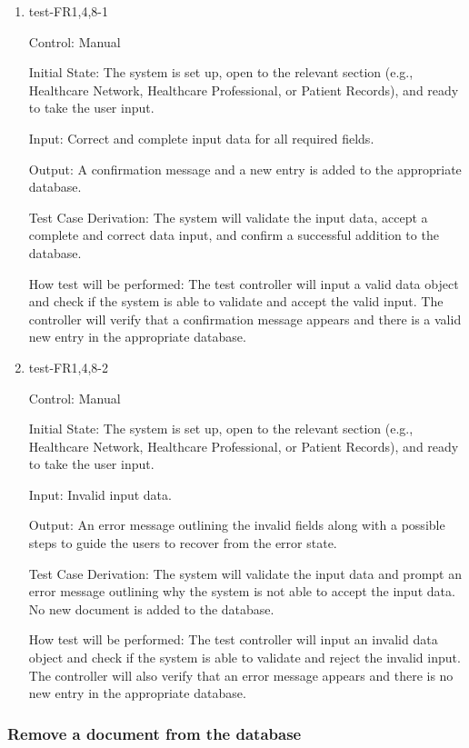 \documentclass[12pt, titlepage]{article}
\begin{document}
\begin{enumerate}

\item{test-FR1,4,8-1} \label{test-FR1,4,8-1}

Control: Manual

Initial State: The system is set up, open to the relevant section (e.g., Healthcare Network, Healthcare Professional, or Patient Records), and ready to take the user input.

Input: Correct and complete input data for all required fields.

Output: A confirmation message and a new entry is added to the appropriate database.

Test Case Derivation: The system will validate the input data, accept a complete and correct data input, and confirm a successful addition to the database.

How test will be performed: The test controller will input a valid data object and check if the system is able to validate and accept the valid input. The controller will verify that a confirmation message appears and there is a valid new entry in the appropriate database.

					
\item{test-FR1,4,8-2} \label{test-FR1,4,8-2}

Control: Manual
					
Initial State: The system is set up, open to the relevant section (e.g., Healthcare Network, Healthcare Professional, or Patient Records), and ready to take the user input.

Input: Invalid input data.

Output: An error message outlining the invalid fields along with a possible steps to guide the users to recover from the error state.

Test Case Derivation: The system will validate the input data and prompt an error message outlining why the system is not able to accept the input data. No new document is added to the database.

How test will be performed: The test controller will input an invalid data object and check if the system is able to validate and reject the invalid input. The controller will also verify that an error message appears and there is no new entry in the appropriate database.

\end{enumerate}


\subsubsection{Remove a document from the database} \label{section:4.1.2}
\end{document}
